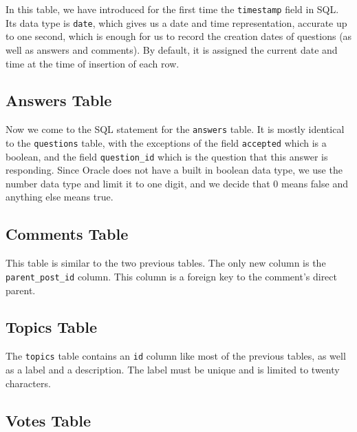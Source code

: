 In this table, we have introduced for the first time the \verb`timestamp` field in SQL. Its data type is \verb`date`, which gives us a date and time representation, accurate up to one second, which is enough for us to record the creation dates of questions (as well as answers and comments). By default, it is assigned the current date and time at the time of insertion of each row.


\subsection{Answers Table}

Now we come to the SQL statement for the \verb`answers` table. It is mostly identical to the \verb`questions` table, with the exceptions of the field \verb`accepted` which is a boolean, and the field \verb`question_id` which is the question that this answer is responding. Since Oracle does not have a built in boolean data type, we use the number data type and limit it to one digit, and we decide that 0 means false and anything else means true.


\subsection{Comments Table}

This table is similar to the two previous tables. The only new column is the \verb`parent_post_id` column. This column is a foreign key to the comment's direct parent.


\subsection{Topics Table}

The \verb`topics` table contains an \verb`id` column like most of the previous tables, as well as a label and a description. The label must be unique and is limited to twenty characters.


\subsection{Votes Table}

